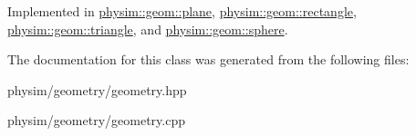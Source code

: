 Implemented in \hyperlink{classphysim_1_1geom_1_1plane_af40afe0d75150a4b45de85a2197137f1}{physim\+::geom\+::plane}, \hyperlink{classphysim_1_1geom_1_1rectangle_adb8cbc4dfa566b8174f2cf25bbc90afe}{physim\+::geom\+::rectangle}, \hyperlink{classphysim_1_1geom_1_1triangle_acb8405efe13b22987018916e5011c247}{physim\+::geom\+::triangle}, and \hyperlink{classphysim_1_1geom_1_1sphere_ae0cfe015fd89080d614c77c0d9042b04}{physim\+::geom\+::sphere}.



The documentation for this class was generated from the following files\+:\begin{DoxyCompactItemize}
\item 
physim/geometry/geometry.\+hpp\item 
physim/geometry/geometry.\+cpp\end{DoxyCompactItemize}
